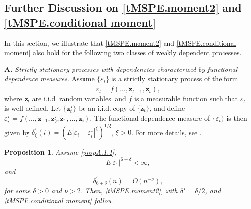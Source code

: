 \documentclass[ejsv2]{imsart}
\theoremstyle{plain}
\newtheorem{proposition}{Proposition}[section]
\theoremstyle{definition}
\theoremstyle{remark}
\begin{document}
\subsection{Further Discussion on \eqref{tMSPE.moment2} and \eqref{tMSPE.conditional moment}}\label{app:A}
In this section, we illustrate that \eqref{tMSPE.moment2} and \eqref{tMSPE.conditional moment} also hold for the following two classes of weakly dependent processes.

{\bf A.} {\it 
Strictly stationary processes with dependencies characterized by functional dependence measures}.
Assume $\{\varepsilon_t\}$ is a strictly stationary process of the form
\begin{equation}\label{propA.1.1}
\varepsilon_t=\tilde{f}(\ldots,\tilde{\mathbf{z}}_{t-1},\tilde{\mathbf{z}}_{t}),
\end{equation}
where $\tilde{\mathbf{z}}_t$ are i.i.d. random variables, and $\tilde{f}$ is a measurable function such that $\varepsilon_t$ is well-defined. Let $\{\mathbf{z}^\star_t\}$ be an i.i.d. copy of $\{\tilde{\mathbf{z}}_t\}$, and define
$\varepsilon_i^\star=\tilde{f}(\ldots,\tilde{\mathbf{z}}_{-1},\mathbf{z}^\star_0,\tilde{\mathbf{z}}_1,\ldots,\tilde{\mathbf{z}}_i)$.
The functional dependence measure of
$\{\varepsilon_t\}$ is then given by
$\delta^\prime_\xi(i)=(E|\varepsilon_i-\varepsilon_i^\star|^\xi)^{1/\xi}$, $\xi>0$.
For more details, see \cite{Wu2005Main}.




\begin{proposition}\label{propA.1}
Assume \eqref{propA.1.1},
\begin{equation}\label{propA.1.3}
E|\varepsilon_1|^{6+{\delta}}<\infty,
\end{equation}
and
\begin{equation}\label{propA.1.2}
\delta^\prime_{6+{\delta}}(n)=O(n^{-\nu}),
\end{equation}
for some ${\delta}>0$ and $\nu>2$. Then, \eqref{tMSPE.moment2},
with $\delta^\star={\delta}/2$,
and \eqref{tMSPE.conditional moment} follow. 
\end{proposition}
\end{document}
